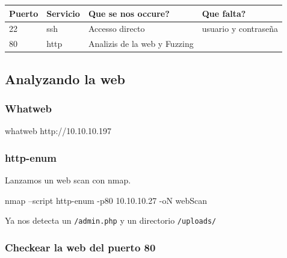 \documentclass{assets/ipesethesis}
\newenvironment{Shaded}{\begin{snugshade}}{\end{snugshade}}
\newcommand{\ExtensionTok}[1]{#1}
\newcommand{\FunctionTok}[1]{\textcolor[rgb]{0.00,0.00,0.00}{#1}}
\newcommand{\NormalTok}[1]{#1}
\begin{document}
\begin{longtable}[]{@{}llll@{}}
\toprule
Puerto & Servicio & Que se nos occure? & Que falta?\tabularnewline
\midrule
\endhead
22 & ssh & Accesso directo & usuario y contraseña\tabularnewline
80 & http & Analizis de la web y Fuzzing &\tabularnewline
\bottomrule
\end{longtable}

\hypertarget{analyzando-la-web}{%
\subsection*{Analyzando la web}\label{analyzando-la-web}}

\hypertarget{whatweb-3}{%
\subsubsection*{Whatweb}\label{whatweb-3}}

\begin{Shaded}
\begin{Highlighting}[]
\ExtensionTok{whatweb}\NormalTok{ http://10.10.10.197}
\end{Highlighting}
\end{Shaded}

\hypertarget{http-enum}{%
\subsubsection*{http-enum}\label{http-enum}}

Lanzamos un web scan con nmap.

\begin{Shaded}
\begin{Highlighting}[]
\FunctionTok{nmap}\NormalTok{ --script http-enum -p80 10.10.10.27 -oN webScan}
\end{Highlighting}
\end{Shaded}

Ya nos detecta un \texttt{/admin.php} y un directorio \texttt{/uploads/}

\hypertarget{checkear-la-web-del-puerto-80}{%
\subsubsection*{Checkear la web del puerto 80}\label{checkear-la-web-del-puerto-80}}
\end{document}
